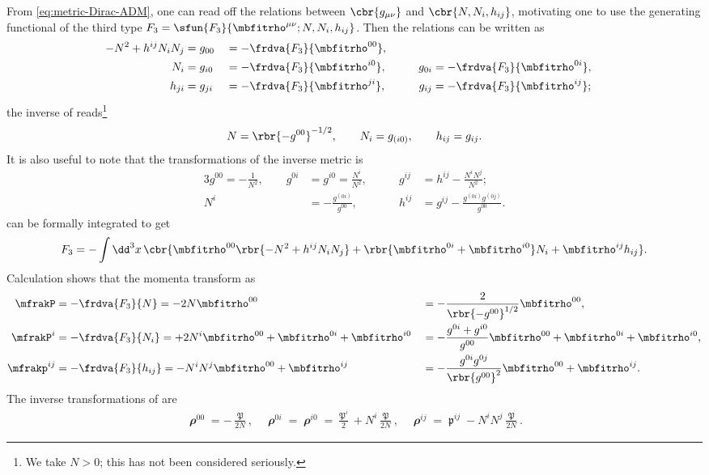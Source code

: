 \documentclass[a4paper,11pt]{article}
\begin{document}
From \cref{eq:metric-Dirac-ADM}, one can read off the relations between 
$\cbr{g_{\mu\nu}}$ and $\cbr{N, N_i, h_{ij}}$, motivating one to use the 
generating functional of the third type $F_3 = \sfun{F_3}{\mbfitrho^{\mu\nu}; 
N, N_i, h_{ij}}$. Then the relations can be written as
\begin{alignat}{5}
-N^2 + h^{ij} N_i N_j &=
g_{00} 
&&= -\frdva{F_3}{\mbfitrho^{00}},
\label{eq:g00nnh}\\
N_i &=
g_{i0}
&&= -\frdva{F_3}{\mbfitrho^{i0}}, \qquad
&g_{0i}
&= -\frdva{F_3}{\mbfitrho^{0i}},
\label{eq:g0innh}\\
h_{ji} &=
g_{ji}
&&= -\frdva{F_3}{\mbfitrho^{ji}}, \qquad
&g_{ij}
&= -\frdva{F_3}{\mbfitrho^{ij}};
\label{eq:gijnnh}
\end{alignat}
the inverse of  reads\footnote{We take $N > 0$; 
this has not been considered seriously.}
\begin{align}
N = \rbr{-g^{00}}^{-1/2},\qquad
N_i = g_{(i0)},\qquad
h_{ij} = g_{ij}.
\label{eq:inv-nnhg}
\end{align}
It is also useful to note that the transformations of the inverse metric is
\begin{alignat}{3}
g^{00} = -\frac{1}{N^2}, \qquad
g^{0i} &= g^{i0} = \frac{N^i}{N^2}, \qquad&
g^{ij} &= h^{ij}-\frac{N^i N^j}{N^2}; \\
N^i &= -\frac{g^{(0i)}}{g^{00}},\qquad&
h^{ij} &= g^{ij} - \frac{g^{(0i)}g^{(0j)}}{g^{00}}.
\end{alignat}
 can be formally integrated to get
\begin{align}
F_3 = - \int \dd^3 x\,\cbr{\mbfitrho^{00}\rbr{-N^2+h^{ij}N_i N_j}
+\rbr{\mbfitrho^{0i}+\mbfitrho^{i0}} N_i + \mbfitrho^{ij}h_{ij}}.
\end{align}
Calculation shows that the momenta transform as
\begin{alignat}{3}
\mfrakP
&= -\frdva{F_3}{N} = -2 N \mbfitrho^{00}
&&= -\frac{2}{\rbr{-g^{00}}^{1/2}}\mbfitrho^{00},
\label{eq:Pinrho00}\\
\mfrakP^i
&= -\frdva{F_3}{N_i} = +2 N^i \mbfitrho^{00} + \mbfitrho^{0i} + \mbfitrho^{i0}
&&= -\frac{g^{0i}+g^{i0}}{g^{00}} \mbfitrho^{00}
+ \mbfitrho^{0i} + \mbfitrho^{i0},
\label{eq:Piinrho0i}\\
\mfrakp^{ij}
&= -\frdva{F_3}{h_{ij}} = -N^i N^j \mbfitrho^{00} + \mbfitrho^{ij}
&&= -\frac{g^{0i}g^{0j}}{\rbr{g^{00}}^2}\mbfitrho^{00} + \mbfitrho^{ij}.
\label{eq:pijinrhoij}
\end{alignat}
The inverse transformations of  are
\begin{align}
\mbfitrho^{00} = -\frac{\mfrakP}{2N}, \quad
\mbfitrho^{0i} = \mbfitrho^{i0} =
\frac{\mfrakP^i}{2} + N^i \frac{\mfrakP}{2N}, \quad
\mbfitrho^{ij} = \mfrakp^{ij}-N^i N^j\frac{\mfrakP}{2N}.
\end{align}
\end{document}
